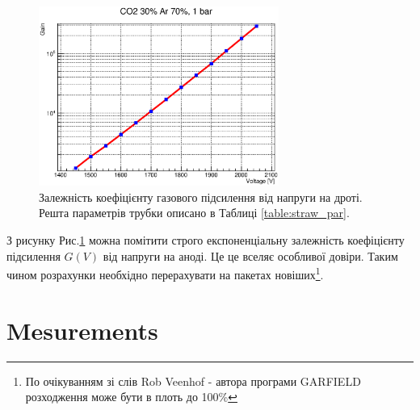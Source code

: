 \documentclass[pdftex,14pt]{scrartcl}
\begin{document}
	\begin{figure}[h!]
	\centering
	\includegraphics[width=0.7\textwidth]{gain_1450_2050V}
	\caption{Залежність коефіцієнту газового підсилення від напруги на дроті. Решта параметрів трубки описано в Таблиці \ref{table:straw_par}.}
	\label{fig:gainVoltage}	
	\end{figure}

	З рисунку Рис.\ref{fig:gainVoltage} можна помітити строго експоненціальну залежність коефіцієнту підсилення $G(V)$ від напруги на аноді. Це це вселяє особливої довіри. Таким чином розрахунки необхідно перерахувати на пакетах новіших\footnote{По очікуванням зі слів Rob Veenhof - автора програми GARFIELD \cite{garfield} розходження може бути в плоть до 100\%}.
	
	
	
	
		
	
		
	\section{Mesurements}
	\label{sec:Mesurements}	
	
	
	
\end{document}
